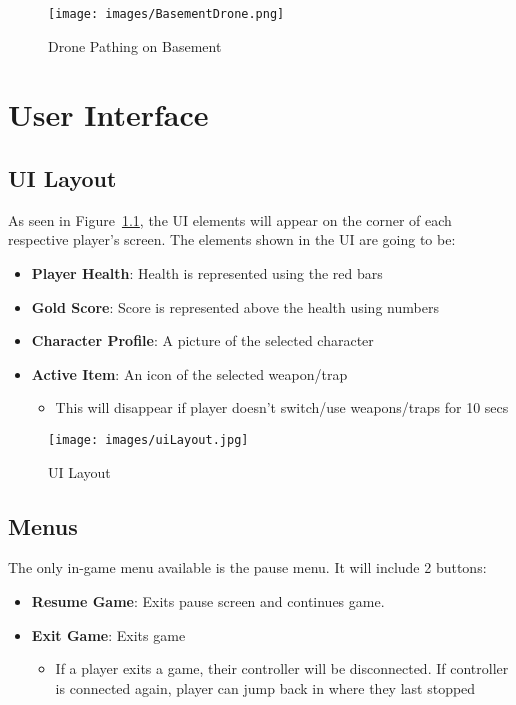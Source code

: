 \documentclass[10pt]{report}
\begin{document}
\begin{figure}[H]
    \centering
    \texttt{[image: images/BasementDrone.png]}
    \caption{Drone Pathing on Basement}
\end{figure}

\chapter{User Interface}

\section{UI Layout}

As seen in Figure~\ref{fig:uilayout}, the UI elements will appear on the corner of each respective player's screen. The elements shown in the UI are going to be:

\begin{itemize}
    \item \textbf{Player Health}: Health is represented using the red bars
    \item \textbf{Gold Score}: Score is represented above the health using numbers
    \item \textbf{Character Profile}: A picture of the selected character
    \item \textbf{Active Item}: An icon of the selected weapon/trap 
    \begin{itemize}
        \item This will disappear if player doesn’t switch/use weapons/traps for 10 secs
    \end{itemize}
\end{itemize}

\begin{figure}[H]
	\texttt{[image: images/uiLayout.jpg]}
    \caption{UI Layout}
\label{fig:uilayout}
\end{figure}

\section{Menus}

The only in-game menu available is the pause menu. It will include 2 buttons:

\begin{itemize}
    \item \textbf{Resume Game}: Exits pause screen and continues game.
    \item \textbf{Exit Game}: Exits game
    \begin{itemize}
        \item If a player exits a game, their controller will be disconnected. If controller is connected again, player can jump back in where they last stopped 
    \end{itemize}
\end{itemize}
\end{document}
